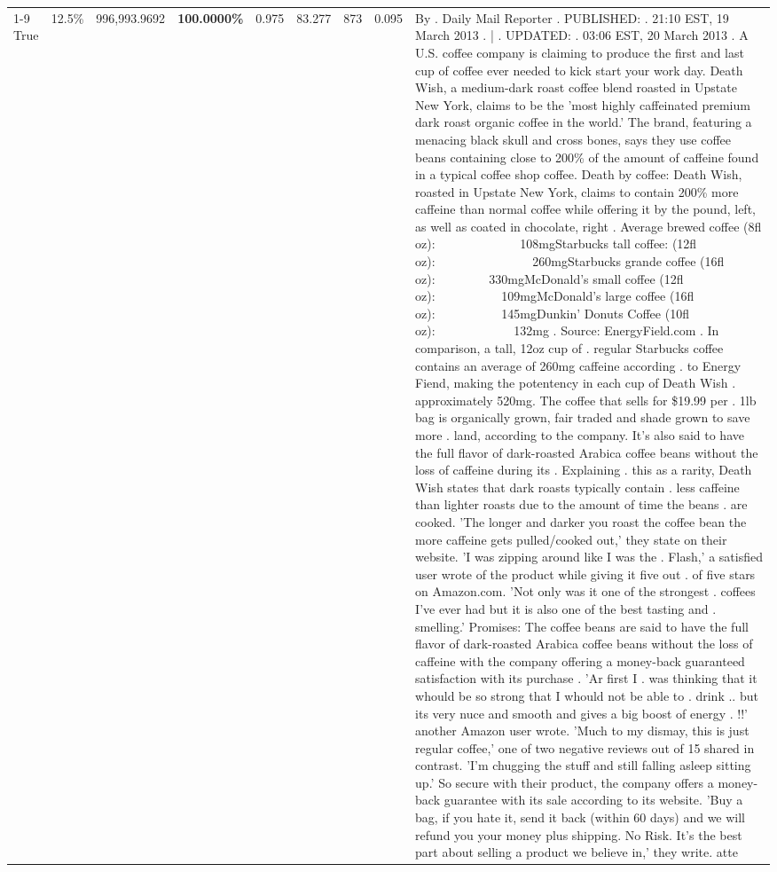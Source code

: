 \begin{table}[H]
{\begin{tabular}{lllrlllll}
\cline{1-9} \cline{2-9}
True & 12.5\% & 996,993.9692 & \bfseries \color{red} 100.0000\% & 0.975 & 83.277 & 873 & 0.095 & By . Daily Mail Reporter . PUBLISHED: . 21:10 EST, 19 March 2013 . | . UPDATED: . 03:06 EST, 20 March 2013 . A U.S. coffee company is claiming to produce the first and last cup of coffee ever needed to kick start your work day. Death Wish, a medium-dark roast coffee blend roasted in Upstate New York, claims to be the 'most highly caffeinated premium dark roast organic coffee in the world.' The brand, featuring a menacing black skull and cross bones, says they use coffee beans containing close to 200\% of the amount of caffeine found in a typical coffee shop coffee. Death by coffee: Death Wish, roasted in Upstate New York, claims to contain 200\% more caffeine than normal coffee while offering it by the pound, left, as well as coated in chocolate, right . Average brewed coffee (8fl oz):              108mgStarbucks tall coffee: (12fl oz):                260mgStarbucks grande coffee (16fl oz):         330mgMcDonald's small coffee (12fl oz):           109mgMcDonald's large coffee (16fl oz):           145mgDunkin' Donuts Coffee (10fl oz):             132mg . Source: EnergyField.com . In comparison, a tall, 12oz cup of . regular Starbucks coffee contains an average of 260mg caffeine according . to Energy Fiend, making the potentency in each cup of Death Wish . approximately 520mg. The coffee that sells for \$19.99 per . 1lb bag is organically grown, fair traded and shade grown to save more . land, according to the company. It's also said to have the full flavor of dark-roasted Arabica coffee beans without the loss of caffeine during its . Explaining . this as a rarity, Death Wish states that dark roasts typically contain . less caffeine than lighter roasts due to the amount of time the beans . are cooked. 'The longer and darker you roast the coffee bean the more caffeine gets pulled/cooked out,' they state on their website. 'I was zipping around like I was the . Flash,' a satisfied user wrote of the product while giving it five out . of five stars on Amazon.com. 'Not only was it one of the strongest . coffees I've ever had but it is also one of the best tasting and . smelling.’ Promises: The coffee beans are said to have the full flavor of dark-roasted Arabica coffee beans without the loss of caffeine with the company offering a money-back guaranteed satisfaction with its purchase . 'Ar first I . was thinking that it whould be so strong that I whould not be able to . drink .. but its very nuce and smooth and gives a big boost of energy . !!' another Amazon user wrote. 'Much to my dismay, this is just regular coffee,' one of two negative reviews out of 15 shared in contrast. 'I'm chugging the stuff and still falling asleep sitting up.' So secure with their product, the company offers a money-back guarantee with its sale according to its website. 'Buy a bag, if you hate it, send it back (within 60 days) and we will refund you your money plus shipping. No Risk. It’s the best part about selling a product we believe in,' they write. atte \\

\end{tabular}}
\end{table}
